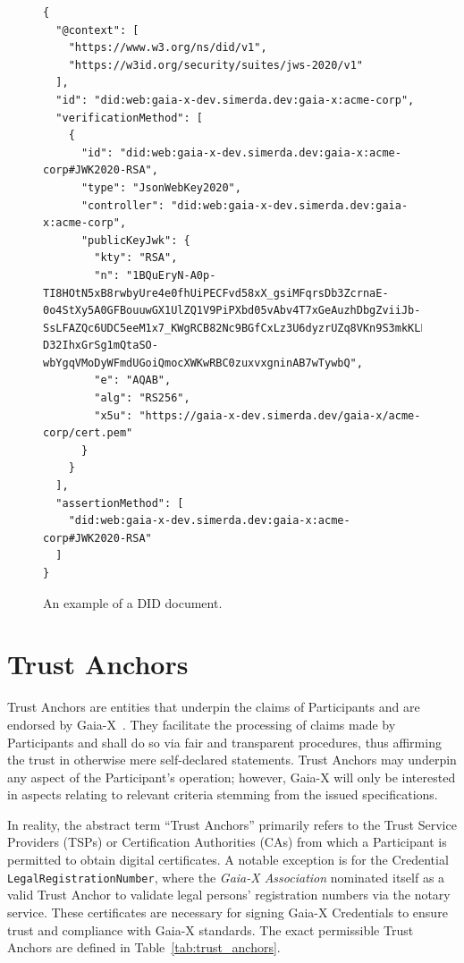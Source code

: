 \begin{figure}
    \centering
    \begin{verbatim}
{
  "@context": [
    "https://www.w3.org/ns/did/v1",
    "https://w3id.org/security/suites/jws-2020/v1"
  ],
  "id": "did:web:gaia-x-dev.simerda.dev:gaia-x:acme-corp",
  "verificationMethod": [
    {
      "id": "did:web:gaia-x-dev.simerda.dev:gaia-x:acme-corp#JWK2020-RSA",
      "type": "JsonWebKey2020",
      "controller": "did:web:gaia-x-dev.simerda.dev:gaia-x:acme-corp",
      "publicKeyJwk": {
        "kty": "RSA",
        "n": "1BQuEryN-A0p-TI8HOtN5xB8rwbyUre4e0fhUiPECFvd58xX_gsiMFqrsDb3ZcrnaE-0o4StXy5A0GFBouuwGX1UlZQ1V9PiPXbd05vAbv4T7xGeAuzhDbgZviiJb-SsLFAZQc6UDC5eeM1x7_KWgRCB82Nc9BGfCxLz3U6dyzrUZq8VKn9S3mkKLLuslewa00X8TCHEAVQFEktVV9F617GXEknrEZhKoZfPeuiweMj4FxuamBRQPaZlCWQduiDnVkmNu4pr7C7HJQkBxxH-D32IhxGrSg1mQtaSO-wbYgqVMoDyWFmdUGoiQmocXWKwRBC0zuxvxgninAB7wTywbQ",
        "e": "AQAB",
        "alg": "RS256",
        "x5u": "https://gaia-x-dev.simerda.dev/gaia-x/acme-corp/cert.pem"
      }
    }
  ],
  "assertionMethod": [
    "did:web:gaia-x-dev.simerda.dev:gaia-x:acme-corp#JWK2020-RSA"
  ]
}
    \end{verbatim}
    \caption{An example of a DID document.}\label{fig:did_document}
\end{figure}

\section{Trust Anchors}\label{sec:trust-anchors}

Trust Anchors are entities that underpin the claims of Participants and are endorsed by Gaia-X~\cite{gaiax_trust_framework}.
They facilitate the processing of claims made by Participants and shall do so via fair and transparent procedures, thus affirming the trust in otherwise mere self-declared statements.
Trust Anchors may underpin any aspect of the Participant's operation; however, Gaia-X will only be interested in aspects relating to relevant criteria stemming from the issued specifications.

In reality, the abstract term ``Trust Anchors'' primarily refers to the Trust Service Providers (TSPs) or Certification Authorities (CAs) from which a Participant is permitted to obtain digital certificates.
A notable exception is for the Credential \texttt{LegalRegistrationNumber}, where the \textit{Gaia-X Association} nominated itself as a valid Trust Anchor to validate legal persons' registration numbers via the notary service.
These certificates are necessary for signing Gaia-X Credentials to ensure trust and compliance with Gaia-X standards.
The exact permissible Trust Anchors are defined in Table~\ref{tab:trust_anchors}.

